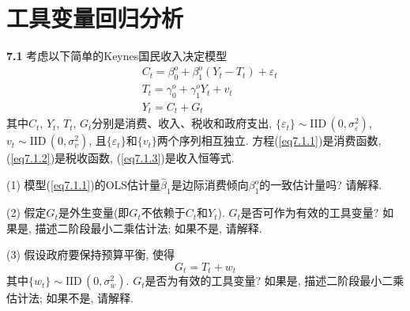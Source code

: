 \documentclass[cn,12pt,math=mtpro2,citestyle=gb7714-2015,bibstyle=gb7714-2015,twocol,mode=simple]{elegantbook}
\newcommand{\hbeta}{\hat{\beta}}
\begin{document}
\chapter*{工具变量回归分析}

\textbf{7.1} 考虑以下简单的Keynes国民收入决定模型
\begin{align}
&C_t=\beta_0^o+\beta_1^o(Y_t-T_t)+\varepsilon_t  \label{eq7.1.1} \tag{7.1.1} \\
&T_t=\gamma_0^o+\gamma_1^oY_t+v_t \label{eq7.1.2} \tag{7.1.2} \\
&Y_t=C_t+G_t  \label{eq7.1.3} \tag{7.1.3}
\end{align}
其中$C_t$, $Y_t$, $T_t$, $G_t$分别是消费、收入、税收和政府支出, $\{\varepsilon_t\}\sim\text{IID}\,(0,\sigma_\varepsilon^2)$, $v_t\sim\text{IID}\,(0,\sigma_v^2)$, 且$\{\varepsilon_t\}$和$\{v_t\}$两个序列相互独立. 方程(\ref{eq7.1.1})是消费函数, (\ref{eq7.1.2})是税收函数, (\ref{eq7.1.3})是收入恒等式.

(1) 模型(\ref{eq7.1.1})的OLS估计量$\hbeta_1$是边际消费倾向$\beta_1^o$的一致估计量吗? 请解释.

(2) 假定$G_t$是外生变量(即$G_t$不依赖于$C_t$和$Y_t$). $G_t$是否可作为有效的工具变量? 如果是, 描述二阶段最小二乘估计法; 如果不是, 请解释.

(3) 假设政府要保持预算平衡, 使得
\begin{equation}\label{eq7.1.4}
  G_t=T_t+w_t \tag{7.1.4}
\end{equation}
其中$\{w_t\}\sim\text{IID}\,(0,\sigma_w^2)$. $G_t$是否为有效的工具变量? 如果是, 描述二阶段最小二乘估计法; 如果不是, 请解释.
\end{document}
